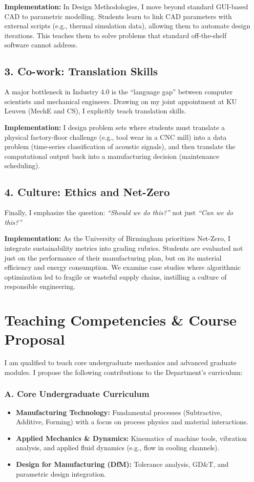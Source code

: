 \documentclass[10pt, a4paper]{article}
\begin{document}
\textbf{Implementation:} In Design Methodologies, I move beyond standard GUI-based CAD to parametric modelling. Students learn to link CAD parameters with external scripts (e.g., thermal simulation data), allowing them to automate design iterations. This teaches them to solve problems that standard off-the-shelf software cannot address.

\subsection*{3. Co-work: Translation Skills}
A major bottleneck in Industry 4.0 is the ``language gap'' between computer scientists and mechanical engineers. Drawing on my joint appointment at KU Leuven (MechE and CS), I explicitly teach translation skills.

\textbf{Implementation:} I design problem sets where students must translate a physical factory-floor challenge (e.g., tool wear in a CNC mill) into a data problem (time-series classification of acoustic signals), and then translate the computational output back into a manufacturing decision (maintenance scheduling).

\subsection*{4. Culture: Ethics and Net-Zero}
Finally, I emphasize the question: \textit{``Should we do this?''} not just \textit{``Can we do this?''}

\textbf{Implementation:} As the University of Birmingham prioritizes Net-Zero, I integrate sustainability metrics into grading rubrics. Students are evaluated not just on the performance of their manufacturing plan, but on its material efficiency and energy consumption. We examine case studies where algorithmic optimization led to fragile or wasteful supply chains, instilling a culture of responsible engineering.

\section*{Teaching Competencies \& Course Proposal}
I am qualified to teach core undergraduate mechanics and advanced graduate modules. I propose the following contributions to the Department’s curriculum:

\subsubsection*{A. Core Undergraduate Curriculum}
\begin{itemize}[leftmargin=*]
    \item \textbf{Manufacturing Technology:} Fundamental processes (Subtractive, Additive, Forming) with a focus on process physics and material interactions.
    \item \textbf{Applied Mechanics \& Dynamics:} Kinematics of machine tools, vibration analysis, and applied fluid dynamics (e.g., flow in cooling channels).
    \item \textbf{Design for Manufacturing (DfM):} Tolerance analysis, GD\&T, and parametric design integration.
\end{itemize}
\end{document}
